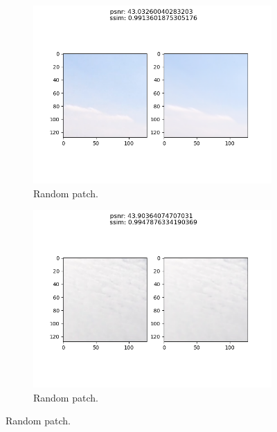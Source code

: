 \begin{enumerate}
    \begin{figure}[H]
        \centering
        \begin{subfigure}{0.4\textwidth}
            \centering
            \includegraphics[scale=0.3]{subsections/srndeblur/image_sky_high_psnr.png}
            \caption{Random patch.}
            \label{high_ssim_patch1}
        \end{subfigure}
        \centering
        \begin{subfigure}{0.4\textwidth}
            \centering
            \includegraphics[scale=0.3]{subsections/srndeblur/image_sky_high_psnr.2.png}
            \caption{Random patch.}
            \label{high_ssim_patch2}
        \end{subfigure}

\end{figure}
\end{enumerate}
